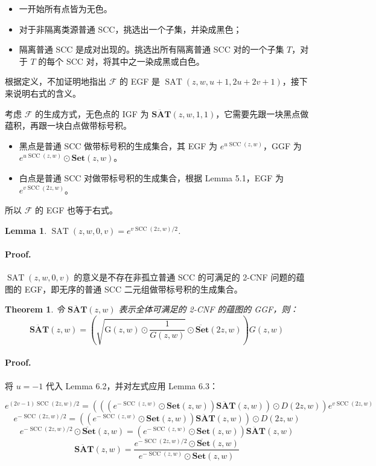 \documentclass[10pt,a4paper,oneside]{article}
\newtheorem{theorem}[definition]{Theorem}
\newtheorem{lemma}[definition]{Lemma}
\begin{document}
\begin{itemize}
    \item 一开始所有点皆为无色。
    \item 对于非隔离类源普通 SCC，挑选出一个子集，并染成黑色；
    \item 隔离普通 SCC 是成对出现的。挑选出所有隔离普通 SCC 对的一个子集 $T$，对于 $T$ 的每个 SCC 对，将其中之一染成黑或白色。
\end{itemize}

根据定义，不加证明地指出 $\mathcal F$ 的 EGF 是 $\operatorname{SAT}(z,w,u+1,2u+2v+1)$，接下来说明右式的含义。

考虑 $\mathcal F$ 的生成方式，无色点的 IGF 为 $\ddot{\mathbf{SAT}}(z,w,1,1)$，它需要先跟一块黑点做蕴积，再跟一块白点做带标号积。

\begin{itemize}
    \item 黑点是普通 SCC 做带标号积的生成集合，其 EGF 为 $e^{u\operatorname{SCC}(z,w)}$，GGF 为 $e^{u\operatorname{SCC}(z,w)}\odot \mathbf{Set}(z,w)$。
    \item 白点是普通 SCC 对做带标号积的生成集合，根据 Lemma 5.1，EGF 为 $e^{v\operatorname{SCC}(2z,w)}$。
\end{itemize}

所以 $\mathcal F$ 的 EGF 也等于右式。

\begin{lemma}
$\operatorname{SAT}(z,w,0,v) = e^{v\operatorname{SCC}(2z,w)/2}$.
\end{lemma}

\paragraph{Proof.} $\operatorname{SAT}(z,w,0,v)$ 的意义是不存在非孤立普通 SCC 的可满足的 2-CNF 问题的蕴图的 EGF，即无序的普通 SCC 二元组做带标号积的生成集合。

\begin{theorem}
    令 $\ddot{\mathbf{SAT}}(z,w)$ 表示全体可满足的 2-CNF 的蕴图的 GGF，则：
\[\ddot{\mathbf{SAT}}(z,w) = \left(\sqrt{\mathrm G(z,w) \odot \dfrac{1}{G(z,w)}} \odot \ddot{\mathbf{Set}}(2z,w)\right) G(z,w)\]
\end{theorem}

\paragraph{Proof.} 将 $u=-1$ 代入 Lemma 6.2，并对左式应用 Lemma 6.3：

\[e^{(2v-1)\operatorname{SCC}(2z,w)/2} = \left(\left(\left(e^{-\operatorname{SCC}(z,w)}\odot \mathbf{Set}(z,w)\right) \ddot{\mathbf{SAT}}(z,w)\right)\odot D(2z,w)\right)e^{v\operatorname{SCC}(2z,w)}\]
\[e^{-\operatorname{SCC}(2z,w)/2} = \left(\left(e^{-\operatorname{SCC}(z,w)}\odot \mathbf{Set}(z,w)\right) \ddot{\mathbf{SAT}}(z,w)\right)\odot D(2z,w)\]
\[e^{-\operatorname{SCC}(2z,w)/2} \odot \ddot{\mathbf{Set}}(z,w)= \left(e^{-\operatorname{SCC}(z,w)}\odot \mathbf{Set}(z,w)\right) \ddot{\mathbf{SAT}}(z,w)\]
\[\ddot{\mathbf{SAT}}(z,w) = \dfrac{e^{-\operatorname{SCC}(2z,w)/2} \odot \ddot{\mathbf{Set}}(z,w)}{e^{-\operatorname{SCC}(z,w)}\odot \mathbf{Set}(z,w)}\]
\end{document}
